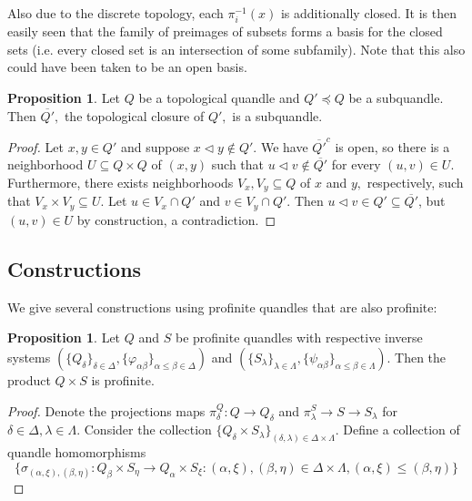 \documentclass[reqno,dvipsnames]{amsart}
\renewcommand{\a}{\alpha}
\renewcommand{\b}{\beta}
\theoremstyle{definition}
\newtheorem{proposition}[theorem]{Proposition}
\begin{document}
{ Also due to the discrete topology, each $\pi_i^{-1}(x)$ is additionally closed. It is then easily seen that the family of preimages of subsets forms a basis for the closed sets (i.e. every closed set is an intersection of some subfamily). Note that this also could have been taken to be an open basis.

\begin{proposition}
Let $Q$ be a topological quandle and $Q' \preceq Q$ be a subquandle. Then $\overline{Q'},$ the topological closure of $Q',$ is a subquandle.
\end{proposition}

\begin{proof}
Let $x,y \in Q'$ and suppose $x \triangleleft y \not\in Q'.$ We have $\overline{Q'}^c$ is open, so there is a neighborhood $U \subseteq Q \times Q$ of $(x,y)$ such that $u \triangleleft v \not\in \overline{Q'}$ for every $(u,v) \in U.$ Furthermore, there exists neighborhoods $V_x,V_y \subseteq Q$ of $x$ and $y,$ respectively, such that $V_x \times V_y \subseteq U.$ Let $u \in V_x \cap Q'$ and $v \in V_y \cap Q'$. Then $u \triangleleft v \in Q' \subseteq \overline{Q'}$, but $(u,v) \in U$ by construction, a contradiction.
\end{proof}

\subsection{Constructions}

We give several constructions using profinite quandles that are also profinite:

\begin{proposition}
Let $Q$ and $S$ be profinite quandles with respective inverse systems $(\{Q_\delta\}_{\delta \in \Delta},\{\varphi_{\alpha\beta}\}_{\a \leq \b \in \Delta})$ and $(\{S_\lambda\}_{\lambda \in \Lambda},\{\psi_{\alpha\beta}\}_{\alpha \leq \beta \in \Lambda})$. Then the product $Q \times S$ is profinite.
\end{proposition}

\begin{proof}
Denote the projections maps $\pi^Q_\delta: Q \to Q_\delta$ and $\pi^S_\lambda \to S \to S_\lambda$ for $\delta \in \Delta,\lambda \in \Lambda$. Consider the collection $\{Q_\delta \times S_\lambda\}_{(\delta,\lambda) \in \Delta \times \Lambda}$. Define a collection of quandle homomorphisms
\[\{\sigma_{(\alpha,\xi),(\beta,\eta)} : Q_\b \times S_\eta \to Q_\a \times S_\xi : (\alpha,\xi),(\beta,\eta) \in \Delta \times \Lambda, (\alpha,\xi)\leq (\beta,\eta)\}\]


\end{proof}}
\end{document}

